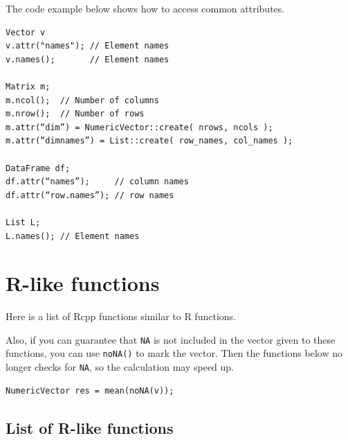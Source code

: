 \documentclass[]{book}
\begin{document}
The code example below shows how to access common attributes.

\begin{verbatim}
Vector v
v.attr("names"); // Element names
v.names();       // Element names

Matrix m;
m.ncol();  // Number of columns
m.nrow();  // Number of rows
m.attr(“dim”) = NumericVector::create( nrows, ncols );
m.attr(“dimnames”) = List::create( row_names, col_names );

DataFrame df;
df.attr(“names”);     // column names
df.attr(“row.names”); // row names

List L;
L.names(); // Element names
\end{verbatim}

\hypertarget{r-like-functions}{%
\chapter{R-like functions}\label{r-like-functions}}

Here is a list of Rcpp functions similar to R functions.

Also, if you can guarantee that \texttt{NA} is not included in the vector given to these functions, you can use \texttt{noNA()} to mark the vector. Then the functions below no longer checks for \texttt{NA}, so the calculation may speed up.

\begin{verbatim}
NumericVector res = mean(noNA(v));
\end{verbatim}

\hypertarget{list-of-r-like-functions}{%
\section{List of R-like functions}\label{list-of-r-like-functions}}
\end{document}
